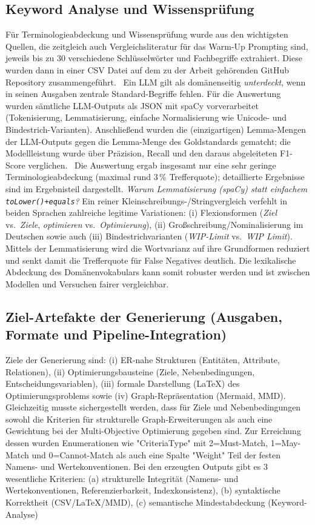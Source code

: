 \documentclass[runningheads]{llncs}
\begin{document}
\subsection{Keyword Analyse und Wissensprüfung}
Für Terminologieabdeckung und Wissensprüfung wurde aus den wichtigsten Quellen, die zeitgleich auch Vergleichsliteratur für das Warm-Up Prompting sind, jeweils bis zu 30 verschiedene Schlüsselwörter und Fachbegriffe extrahiert. Diese wurden dann in einer CSV Datei auf dem zu der Arbeit gehörenden GitHub Repository zusammengeführt.~\cite{ref_url_repo} Ein LLM gilt als domänenseitig \emph{unterdeckt}, wenn in seinen Ausgaben zentrale Standard-Begriffe fehlen. Für die Auswertung wurden sämtliche LLM-Outputs als JSON mit spaCy vorverarbeitet (Tokenisierung, Lemmatisierung, einfache Normalisierung wie Unicode- und Bindestrich-Varianten). Anschließend wurden die (einzigartigen) Lemma-Mengen der LLM-Outputs gegen die Lemma-Menge des Goldstandards gematcht; die Modellleistung wurde über Präzision, Recall und den daraus abgeleiteten F1-Score verglichen.~\cite{ref_url_spacy} Die Auswertung ergab insgesamt nur eine sehr geringe Terminologieabdeckung (maximal rund 3\,\% Trefferquote); detaillierte Ergebnisse sind im Ergebnisteil dargestellt. \textit{Warum Lemmatisierung (spaCy) statt einfachem \texttt{toLower()+equals}?} Ein reiner Kleinschreibungs-/Stringvergleich verfehlt in beiden Sprachen zahlreiche legitime Variationen: (i) Flexionsformen (\emph{Ziel} vs.\ \emph{Ziele}, \emph{optimieren} vs.\ \emph{Optimierung}), (ii) Großschreibung/Nominalisierung im Deutschen sowie auch (iii) Bindestrichvarianten (\emph{WIP-Limit} vs.\ \emph{WIP Limit}). Mittels der Lemmatisierung wird die Wortvarianz auf ihre Grundformen reduziert und senkt damit die Trefferquote für False Negatives deutlich. Die lexikalische Abdeckung des Domänenvokabulars kann somit robuster werden und ist zwischen Modellen und Versuchen fairer vergleichbar.

\subsection{Ziel-Artefakte der Generierung (Ausgaben, Formate und Pipeline-Integration)}
Ziele der Generierung sind:
(i) ER-nahe Strukturen (Entitäten, Attribute, Relationen), 
(ii) Optimierungsbausteine (Ziele, Nebenbedingungen, Entscheidungsvariablen), 
(iii) formale Darstellung (LaTeX) des Optimierungsproblems sowie 
(iv) Graph-Repräsentation (Mermaid, MMD). Gleichzeitig musste sichergestellt werden, dass für Ziele und Nebenbedingungen sowohl die Kriterien für strukturelle Graph-Erweiterungen als auch eine Gewichtung bei der Multi-Objective Optimierung gegeben sind. Zur Erreichung dessen wurden Enumerationen wie "CriteriaType" mit 2=Must-Match, 1=May-Match und 0=Cannot-Match als auch eine Spalte "Weight" Teil der festen Namens- und Wertekonventionen. Bei den erzeugten Outputs gibt es 3 wesentliche Kriterien:
(a) strukturelle Integrität (Namens- und Wertekonventionen, Referenzierbarkeit, Indexkonsistenz), 
(b) syntaktische Korrektheit (CSV/LaTeX/MMD), 
(c) semantische Mindestabdeckung (Keyword-Analyse)
\end{document}
